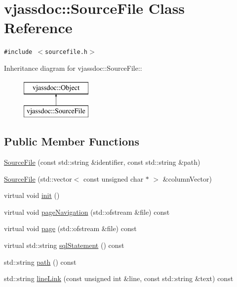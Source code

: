 \hypertarget{classvjassdoc_1_1SourceFile}{
\section{vjassdoc::SourceFile Class Reference}
\label{classvjassdoc_1_1SourceFile}
}
{\tt \#include $<$sourcefile.h$>$}

Inheritance diagram for vjassdoc::SourceFile::\begin{figure}[H]
\begin{center}
\leavevmode
\includegraphics[height=2cm]{classvjassdoc_1_1SourceFile}
\end{center}
\end{figure}
\subsection*{Public Member Functions}
\begin{CompactItemize}
\item 
\hyperlink{classvjassdoc_1_1SourceFile_e4dd92032b7498bf71ddb71daa30253a}{SourceFile} (const std::string \&identifier, const std::string \&path)
\item 
\hyperlink{classvjassdoc_1_1SourceFile_e0d55673a13f69697ed0dd2130b9535b}{SourceFile} (std::vector$<$ const unsigned char $\ast$ $>$ \&columnVector)
\item 
virtual void \hyperlink{classvjassdoc_1_1SourceFile_e2aa3f034bbb18de023ce9a21dfa78d1}{init} ()
\item 
virtual void \hyperlink{classvjassdoc_1_1SourceFile_b365551c64c03553e8fb1a31d83edaea}{pageNavigation} (std::ofstream \&file) const 
\item 
virtual void \hyperlink{classvjassdoc_1_1SourceFile_0a4aed2c620f52f3cb114843f674b31c}{page} (std::ofstream \&file) const 
\item 
virtual std::string \hyperlink{classvjassdoc_1_1SourceFile_cda6410687f71928eafac94a635c4250}{sqlStatement} () const 
\item 
std::string \hyperlink{classvjassdoc_1_1SourceFile_4764039ae2d00f6fbdc41186972b5ff9}{path} () const 
\item 
std::string \hyperlink{classvjassdoc_1_1SourceFile_b470fdc8f3bb45197ba3ca3fd7aefbea}{lineLink} (const unsigned int \&line, const std::string \&text) const 
\end{CompactItemize}
